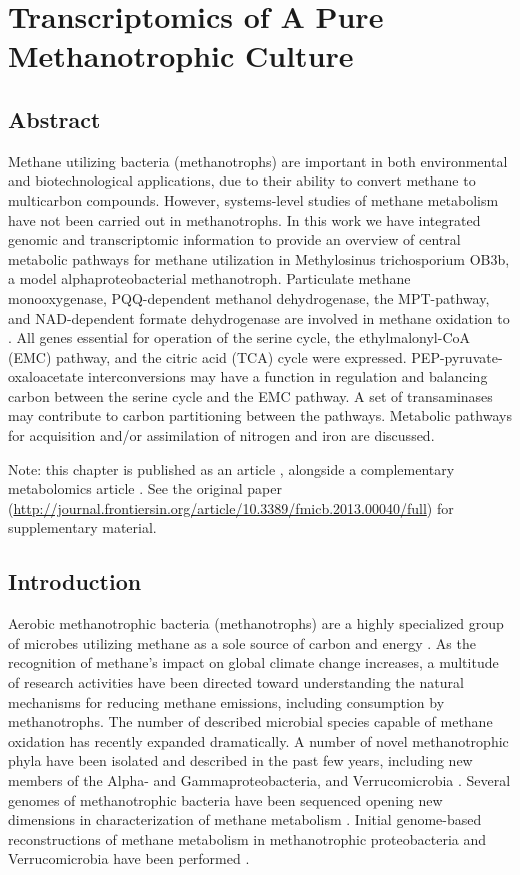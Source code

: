 \chapter{Transcriptomics of A Pure Methanotrophic Culture}
\label{chapter:A}


\section{Abstract}
Methane utilizing bacteria (methanotrophs) are important in both environmental and biotechnological applications, due to their ability to convert methane to multicarbon compounds.
However, systems-level studies of methane metabolism have not been carried out in methanotrophs.
In this work we have integrated genomic and transcriptomic information to provide an overview of central metabolic pathways for methane utilization in Methylosinus trichosporium OB3b, a model alphaproteobacterial methanotroph.
Particulate methane monooxygenase, PQQ-dependent methanol dehydrogenase, the MPT-pathway, and NAD-dependent formate dehydrogenase are involved in methane oxidation to .
All genes essential for operation of the serine cycle, the ethylmalonyl-CoA (EMC) pathway, and the citric acid (TCA) cycle were expressed.
PEP-pyruvate-oxaloacetate interconversions may have a function in regulation and balancing carbon between the serine cycle and the EMC pathway.
A set of transaminases may contribute to carbon partitioning between the pathways.
Metabolic pathways for acquisition and/or assimilation of nitrogen and iron are discussed.

Note: this chapter is published as an article \cite{matsenOB3b}, alongside a complementary metabolomics article \cite{yangOB3b}.
See the original paper (\url{http://journal.frontiersin.org/article/10.3389/fmicb.2013.00040/full}) for supplementary material. 

\section{Introduction}
Aerobic methanotrophic bacteria (methanotrophs) are a highly specialized group of microbes utilizing methane as a sole source of carbon and energy \cite{hanson1996, murrell2009}.
As the recognition of methane’s impact on global climate change increases, a multitude of research activities have been directed toward understanding the natural mechanisms for reducing methane emissions, including consumption by methanotrophs.
The number of described microbial species capable of methane oxidation has recently expanded dramatically.
A number of novel methanotrophic phyla have been isolated and described in the past few years, including new members of the Alpha- and Gammaproteobacteria, and Verrucomicrobia \cite{trotsenko2008, mila2009, murrell2009}.
Several genomes of methanotrophic bacteria have been sequenced opening new dimensions in characterization of methane metabolism \cite{ward2004, dunfield2007, hou2008, chen2010, stein2010, stein2011, dam2012b}.
Initial genome-based reconstructions of methane metabolism in methanotrophic proteobacteria and Verrucomicrobia have been performed \cite{ward2004, kelly2005, hou2008, khadem2011}.

